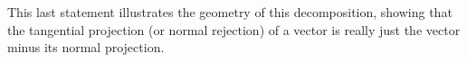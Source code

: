 %
This last statement illustrates the geometry of this decomposition, showing that the tangential projection (or normal rejection) of a vector is really just the vector minus its normal projection.
%
%
%

